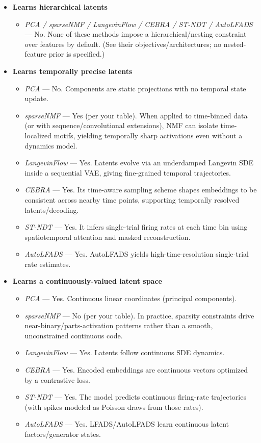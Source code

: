 \begin{itemize}
\item \textbf{Learns hierarchical latents}
    \begin{itemize}
    \item \textit{PCA / sparseNMF / LangevinFlow / CEBRA / ST-NDT / AutoLFADS} — No. None of these methods impose a hierarchical/nesting constraint over features by default. (See their objectives/architectures; no nested-feature prior is specified.)
    \end{itemize}

\item \textbf{Learns temporally precise latents}
    \begin{itemize}
    \item \textit{PCA} — No. Components are static projections with no temporal state update.
    \item \textit{sparseNMF} — Yes (per your table). When applied to time-binned data (or with sequence/convolutional extensions), NMF can isolate time-localized motifs, yielding temporally sharp activations even without a dynamics model.
    \item \textit{LangevinFlow} — Yes. Latents evolve via an underdamped Langevin SDE inside a sequential VAE, giving fine-grained temporal trajectories.
    \item \textit{CEBRA} — Yes. Its time-aware sampling scheme shapes embeddings to be consistent across nearby time points, supporting temporally resolved latents/decoding.
    \item \textit{ST-NDT} — Yes. It infers single-trial firing rates at each time bin using spatiotemporal attention and masked reconstruction.
    \item \textit{AutoLFADS} — Yes. AutoLFADS yields high-time-resolution single-trial rate estimates.
    \end{itemize}

\item \textbf{Learns a continuously-valued latent space}
    \begin{itemize}
    \item \textit{PCA} — Yes. Continuous linear coordinates (principal components).
    \item \textit{sparseNMF} — No (per your table). In practice, sparsity constraints drive near-binary/parts-activation patterns rather than a smooth, unconstrained continuous code.
    \item \textit{LangevinFlow} — Yes. Latents follow continuous SDE dynamics.
    \item \textit{CEBRA} — Yes. Encoded embeddings are continuous vectors optimized by a contrastive loss.
    \item \textit{ST-NDT} — Yes. The model predicts continuous firing-rate trajectories (with spikes modeled as Poisson draws from those rates).
    \item \textit{AutoLFADS} — Yes. LFADS/AutoLFADS learn continuous latent factors/generator states.
    \end{itemize}


\end{itemize}
